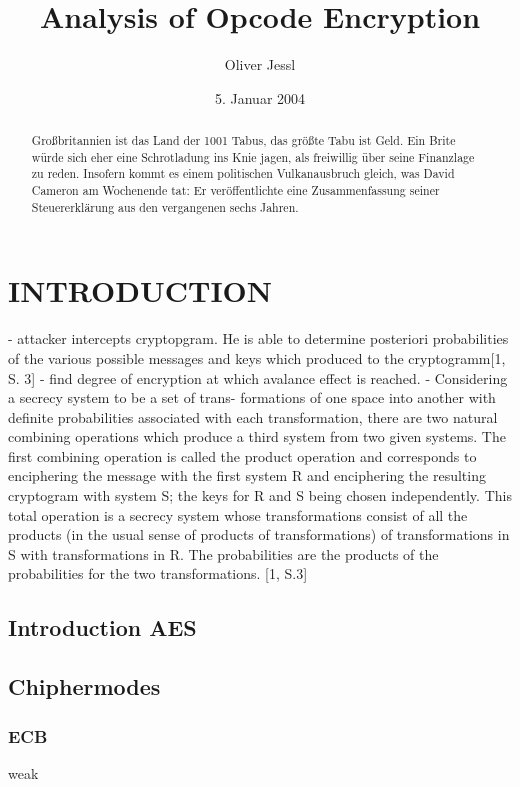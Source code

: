 \documentclass[11pt]{scrartcl}
\title{Analysis of Opcode Encryption}
\date{5. Januar 2004}
\author{Oliver Jessl}
\begin{document}
\maketitle
\tableofcontents

\begin{abstract}
Großbritannien ist das Land der 1001 Tabus, das größte Tabu ist Geld. Ein Brite würde sich eher eine Schrotladung ins Knie jagen, als freiwillig über seine Finanzlage zu reden. Insofern kommt es einem politischen Vulkanausbruch gleich, was David Cameron am Wochenende tat: Er veröffentlichte eine Zusammenfassung seiner Steuererklärung aus den vergangenen sechs Jahren.
\end{abstract}

\section{INTRODUCTION}

 - attacker intercepts cryptopgram. He is able to determine posteriori probabilities of the various possible messages and keys which produced to the cryptogramm[1, S. 3]
 - find degree of encryption at which avalance effect is reached.
 - Considering a secrecy system to be a set of trans-
 formations of one space into another with definite probabilities
 associated with each transformation, there are two natural combining
 operations which produce a third system from two given systems.
 The first combining operation is called the product operation and
 corresponds to enciphering the message with the first system R and
 enciphering the resulting cryptogram with system S; the keys for R
 and S being chosen independently. This total operation is a secrecy
 system whose transformations consist of all the products (in the
 usual sense of products of transformations) of transformations in S
 with transformations in R. The probabilities are the products of the
 probabilities for the two transformations. [1, S.3]
 
  

\subsection{Introduction AES}

\subsection{Chiphermodes}

\subsubsection{ECB}
 weak \cite{todo}
\end{document}
